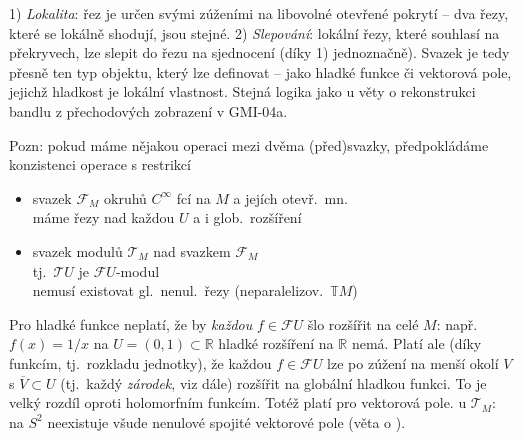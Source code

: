 \begin{vysvetleni}
1) \emph{Lokalita}: řez je určen svými zúženími na libovolné otevřené pokrytí -- dva řezy, které se lokálně shodují, jsou stejné.
2) \emph{Slepování}: lokální řezy, které souhlasí na překryvech, lze slepit do řezu na sjednocení (díky 1) jednoznačně).
Svazek je tedy přesně ten typ objektu, který lze definovat  -- jako hladké funkce či vektorová pole, jejichž hladkost je lokální vlastnost.
Stejná logika jako u věty o rekonstrukci bandlu z přechodových zobrazení v GMI-04a.
\end{vysvetleni}

Pozn: pokud máme nějakou operaci mezi dvěma (před)svazky, předpokládáme konzistenci operace s restrikcí

\begin{priklad}[Př]
\begin{itemize}[nosep]
  \item[-] svazek $\mathcal{F}_M$ okruhů $C^\infty$ fcí na $M$ a jejích otevř.\ mn. \\
           máme řezy nad každou $U$ a i glob.\ rozšíření
  \item[-] svazek modulů $\mathcal{T}_M$ nad svazkem $\mathcal{F}_M$ \\
           tj.\ $\mathcal{T}U$ je $\mathcal{F}U$-modul \\
           nemusí existovat gl.\ nenul.\ řezy \quad (neparalelizov.\ $\mathbb{T}M$)
\end{itemize}
\end{priklad}

\begin{vysvetleni}
Pro hladké funkce neplatí, že by \emph{každou} $f\in\mathcal{F}U$ šlo rozšířit na celé $M$: např.\ $f(x)=1/x$ na $U=(0,1)\subset\mathbb{R}$ hladké rozšíření
na $\mathbb{R}$ nemá. Platí ale (díky  funkcím, tj.\ rozkladu jednotky), že každou $f\in\mathcal{F}U$ lze po zúžení na menší okolí $V$ s $\overline V\subset U$
(tj.\ každý \emph{zárodek}, viz dále) rozšířit na globální hladkou funkci. To je velký rozdíl oproti holomorfním funkcím.
Totéž platí pro vektorová pole.  u $\mathcal{T}_M$: na $S^2$ neexistuje všude nenulové spojité vektorové pole (věta o ).
\end{vysvetleni}

